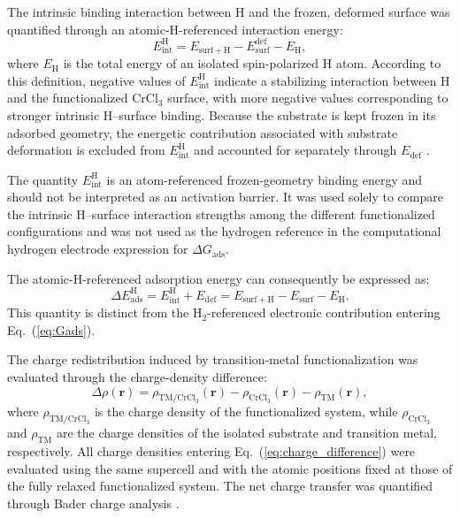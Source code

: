 \documentclass[journal=jacsat,manuscript=article]{achemso}
\begin{document}
The intrinsic binding interaction between H and the frozen, deformed surface was quantified through an atomic-H-referenced interaction energy:
\begin{equation}
  E_{\mathrm{int}}^{\mathrm{H}}
  =
  E_{\mathrm{surf+H}}
  -
  E_{\mathrm{surf}}^{\mathrm{def}}
  -
  E_{\mathrm{H}},
  \label{eq:Eint}
\end{equation}
where $E_{\mathrm{H}}$ is the total energy of an isolated spin-polarized H atom. According to this definition, negative values of $E_{\mathrm{int}}^{\mathrm{H}}$ indicate a stabilizing interaction between H and the functionalized CrCl$_3$ surface, with more negative values corresponding to stronger intrinsic H--surface binding. Because the substrate is kept frozen in its adsorbed geometry, the energetic contribution associated with substrate deformation is excluded from $E_{\mathrm{int}}^{\mathrm{H}}$ and accounted for separately through $E_{\mathrm{def}}$ \cite{Staub2019,Clabaut2020}.

The quantity $E_{\mathrm{int}}^{\mathrm{H}}$ is an atom-referenced frozen-geometry binding energy and should not be interpreted as an activation barrier. It was used solely to compare the intrinsic H--surface interaction strengths among the different functionalized configurations and was not used as the hydrogen reference in the computational hydrogen electrode expression for $\Delta G_{\mathrm{ads}}$.

The atomic-H-referenced adsorption energy can consequently be expressed as:
\begin{equation}
  \Delta E_{\mathrm{ads}}^{\mathrm{H}}
  =
  E_{\mathrm{int}}^{\mathrm{H}}
  +
  E_{\mathrm{def}}
  =
  E_{\mathrm{surf+H}}
  -
  E_{\mathrm{surf}}
  -
  E_{\mathrm{H}}.
  \label{eq:Eads_atomic}
\end{equation}
This quantity is distinct from the H$_2$-referenced electronic contribution entering Eq.~(\ref{eq:Gads}).

The charge redistribution induced by transition-metal functionalization was evaluated through the charge-density difference:
\begin{equation}
  \Delta \rho(\mathbf{r})
  =
  \rho_{\mathrm{TM/CrCl_3}}(\mathbf{r})
  -
  \rho_{\mathrm{CrCl_3}}(\mathbf{r})
  -
  \rho_{\mathrm{TM}}(\mathbf{r}),
  \label{eq:charge_difference}
\end{equation}
where $\rho_{\mathrm{TM/CrCl_3}}$ is the charge density of the functionalized system, while $\rho_{\mathrm{CrCl_3}}$ and $\rho_{\mathrm{TM}}$ are the charge densities of the isolated substrate and transition metal, respectively. All charge densities entering Eq.~(\ref{eq:charge_difference}) were evaluated using the same supercell and with the atomic positions fixed at those of the fully relaxed functionalized system. The net charge transfer was quantified through Bader charge analysis \cite{Henkelman2006,Tang_2009, SANVILLEJCC2007, YUJPCP2011}.
\end{document}
